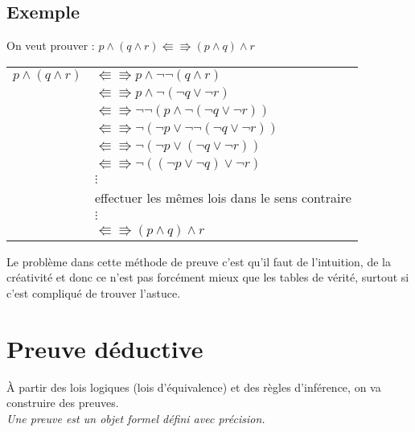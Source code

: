 			\subsection*{Exemple}
			On veut prouver : $p \land (q \land r) \Lleftarrow \Rrightarrow (p \land q) \land r$
			\begin{center}
			\begin{tabular}{ll}
			
			$p \land (q \land r)$ & $\Lleftarrow \Rrightarrow p \land \lnot \lnot (q \land r)$\\
			& $\Lleftarrow \Rrightarrow p \land \lnot (\lnot q \lor \lnot r)$\\
			& $\Lleftarrow \Rrightarrow \lnot \lnot (p \land \lnot (\lnot q \lor \lnot r))$\\
			& $\Lleftarrow \Rrightarrow \lnot (\lnot p \lor \lnot \lnot (\lnot q \lor \lnot r))$\\
			& $\Lleftarrow \Rrightarrow \lnot (\lnot p \lor (\lnot q \lor \lnot r))$\\
			& $\Lleftarrow \Rrightarrow \lnot ((\lnot p \lor \lnot q) \lor \lnot r)$\\
			&$\vdots$\\
			& effectuer les mêmes lois dans le sens contraire \\
			&$\vdots$\\
			& $\Lleftarrow \Rrightarrow (p \land q) \land r$\\
			\end{tabular}
			\end{center}
			Le problème dans cette méthode de preuve c'est qu'il faut de l'intuition, de la créativité et donc ce n'est pas forcément mieux que les tables de vérité, surtout si c'est compliqué de trouver l'astuce.
		
		\section{Preuve déductive}
		À partir des lois logiques (lois d'équivalence) et des règles d'inférence, on va construire des preuves.\\
		\textit{Une preuve est un objet formel défini avec précision.\\}
		
